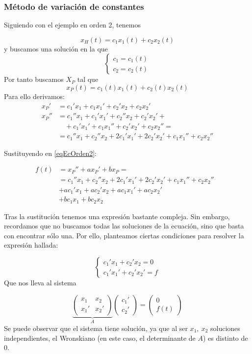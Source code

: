 \subsubsection{Método de variación de constantes}
\label{secMetodoVarConst}

Siguiendo con el ejemplo en orden 2, tenemos

\[ x_H (t) = c_1x_1(t) + c_2x_2(t) \]
y buscamos una solución en la que
$$
\left\lbrace
\begin{array}{l}
c_1 = c_1(t)\\
c_2 = c_2(t)
\end{array}
\right.
$$
Por tanto buscamos $X_P$ tal que
\[ x_P(t) = c_1(t)x_1(t) + c_2(t)x_2(t) \] Para ello derivamos:
\begin{align*}
x_P'&= c_1'x_1 + c_1x_1' + c_2'x_2 + c_2x_2' \\
x_P'' 	&= c_1''x_1+c_1'x_1' + c_2''x_2+c_2'x_2' + \\
		&\quad+ c_1'x_1'+c_1x_1'' + c_2'x_2' + c_2x_2'' = \\
		&= c_1''x_1 + c_2''x_2+2c_1'x_1'+2c_2'x_2' + c_1x_1'' +c_2x_2''
\end{align*}

Sustituyendo en \eqref{eqEcOrden2}:

\begin{align*}
f(t) &= x_P'' + ax_P' + bx_P = &  \\
	&= c_1''x_1 + c_2''x_2 + 2c_1'x_1' + 2c_2'x_2'  + c_1x_1''  + c_2x_2'' \\
	& + ac_1' x_1 + ac_2'x_2  + ac_1x_1'  + ac_2x_2' \\
	&  + bc_1x_1  + bc_2x_2 
\end{align*}

Tras la sustitución tenemos una expresión bastante compleja. Sin embargo, recordamos que no buscamos todas las soluciones de la ecuación, sino que basta con encontrar sólo una. Por ello, planteamos ciertas condiciones para resolver la expresión hallada:

$$ \left\lbrace \begin{array}{l}
c_1'x_1 + c_2'x_2 = 0 \\
c_1'x_1' + c_2'x_2' = f
\end{array} \right. $$
Que nos lleva al sistema

\[ \underbrace{\begin{pmatrix}
x_1 & x_2 \\
x_1' & x_2'
\end{pmatrix}}_A\begin{pmatrix}
c_1' \\ c_2'
\end{pmatrix} = \begin{pmatrix}
0 \\ f(t)
\end{pmatrix} \]
Se puede observar que el sistema tiene solución, ya que al ser $x_1,\ x_2$ soluciones independientes, el Wronskiano (en este caso, el determinante de $A$) es distinto de $0$.

